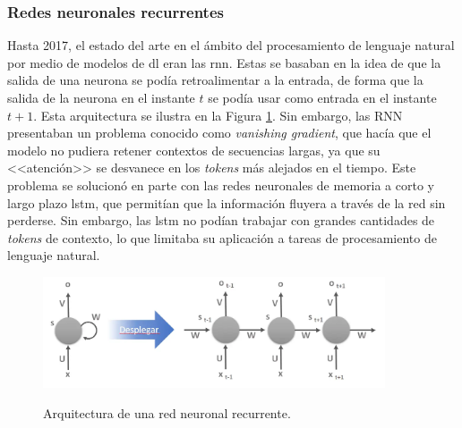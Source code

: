 \subsubsection{Redes neuronales recurrentes}
Hasta 2017, el estado del arte en el ámbito del procesamiento de lenguaje natural por medio de modelos de \gls{dl} eran las \gls{rnn}. Estas se basaban en la idea de que la salida de una neurona se podía retroalimentar a la entrada, de forma que la salida de la neurona en el instante $t$ se podía usar como entrada en el instante $t+1$. Esta arquitectura se ilustra en la Figura \ref{fig:red_neuronal_recurrente}. Sin embargo, las RNN presentaban un problema conocido como \textit{vanishing gradient}, que hacía que el modelo no pudiera retener contextos de secuencias largas, ya que su <<atención>> se desvanece en los \textit{tokens} más alejados en el tiempo. Este problema se solucionó en parte con las redes neuronales de memoria a corto y largo plazo \gls{lstm}, que permitían que la información fluyera a través de la red sin perderse. Sin embargo, las \gls{lstm} no podían trabajar con grandes cantidades de \textit{tokens} de contexto, lo que limitaba su aplicación a tareas de procesamiento de lenguaje natural.

\begin{figure}[H]
    \caption[Arquitectura de una red neuronal recurrente]{Arquitectura de una red neuronal recurrente.}
    \centering
    \includegraphics[width=0.9\textwidth]{./figuras/red_neuronal_recurrente.png}
    \label{fig:red_neuronal_recurrente}
\end{figure}


